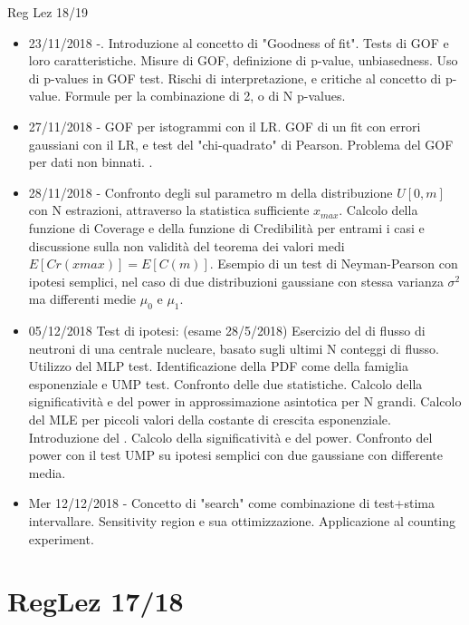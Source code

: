 \begin{frame}[allowframebreaks]{Reg Lez 18/19}
\begin{itemize}
\item 23/11/2018 -. Introduzione al concetto di "Goodness of fit". Tests di GOF e loro caratteristiche. Misure di GOF, definizione di p-value, unbiasedness. Uso di p-values in GOF test. Rischi di interpretazione, e critiche al concetto di p-value. Formule per la combinazione di 2, o di N p-values.  
\item 27/11/2018 - GOF per istogrammi con il LR. GOF di un fit con errori gaussiani con il LR, e test del "chi-quadrato" di Pearson. Problema del GOF per dati non binnati. .
\item 28/11/2018 - Confronto degli  sul parametro m della distribuzione $U[0,m]$ con N estrazioni, attraverso la statistica sufficiente $x_{max}$. Calcolo della funzione di Coverage e della funzione di Credibilità per entrami i casi e discussione sulla non validità del teorema dei valori medi $E[Cr(xmax)] = E[C(m)]$. Esempio di un test di Neyman-Pearson con ipotesi semplici, nel caso di due distribuzioni gaussiane con stessa varianza $\sigma^2$ ma differenti medie $\mu_0$ e $\mu_1$.
\item  05/12/2018 Test di ipotesi: (esame 28/5/2018) Esercizio del  di flusso di neutroni di una centrale nucleare, basato sugli ultimi N conteggi di flusso. Utilizzo del MLP test. Identificazione della PDF come della famiglia esponenziale e UMP test. Confronto delle due statistiche. Calcolo della significatività e del power in approssimazione asintotica per N grandi. Calcolo del MLE per piccoli valori della costante di crescita esponenziale. Introduzione del . Calcolo della significatività e del power. Confronto del power con il test UMP su ipotesi semplici con due gaussiane con differente media.
\item Mer 12/12/2018 - Concetto di "search" come combinazione di test+stima intervallare. Sensitivity region e sua ottimizzazione. Applicazione al counting experiment.
    \end{itemize}
\end{frame}

\section{RegLez 17/18}

